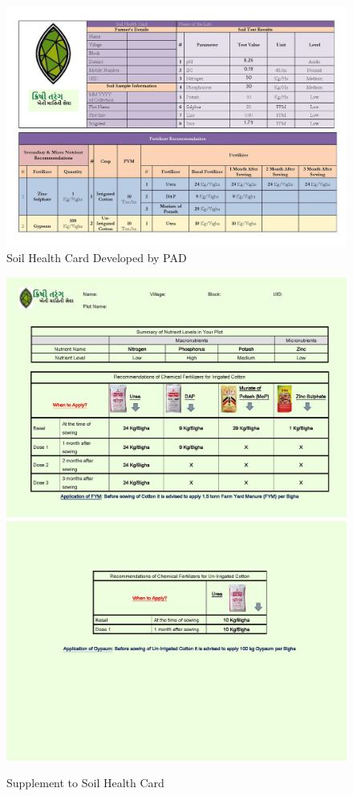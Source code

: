 \documentclass{article}
\begin{document}
\begin{figure}[!htb] \centering \caption{Soil Health Card Developed by PAD} \label{f:shc}
\includegraphics[width=0.9\linewidth]{figures/shc/shc} 
\end{figure}

\FloatBarrier

\pagebreak
\clearpage

\begin{figure}[!htb] \centering \caption{Supplement to Soil Health Card} \label{f:shc_supplement}
\includegraphics[width=0.9\linewidth]{figures/shc/shc_supplement} 
\includegraphics[width=0.9\linewidth]{figures/shc/shc_supplement_2} 
\end{figure}
\end{document}
